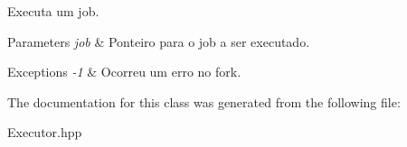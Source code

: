 Executa um job. 


\begin{DoxyParams}{Parameters}
{\em job} & Ponteiro para o job a ser executado. \\
\hline
\end{DoxyParams}

\begin{DoxyExceptions}{Exceptions}
{\em -\/1} & Ocorreu um erro no fork. \\
\hline
\end{DoxyExceptions}


The documentation for this class was generated from the following file:\begin{DoxyCompactItemize}
\item 
Executor.hpp\end{DoxyCompactItemize}
